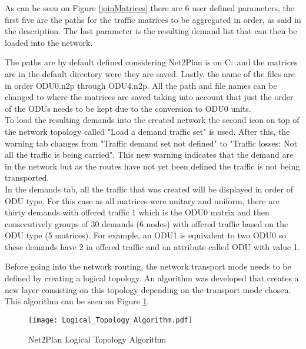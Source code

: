 	As can be seen on Figure \ref{joinMatrices} there are 6 user defined parameters, the first five are the paths for the traffic matrices to be aggregated in order, as said in the description. The last parameter is the resulting demand list that can then be loaded into the network.
	
	The paths are by default defined considering Net2Plan is on C:\ and the matrices are in the default directory were they are saved. Lastly, the name of the files are in order ODU0.n2p through ODU4.n2p. All the path and file names can be changed to where the matrices are saved taking into account that just the order of the ODUs needs to be kept due to the conversion to ODU0 units.\\
	
	To load the resulting demands into the created network the second icon on top of the network topology called "Load a demand traffic set" is used. After this, the warning tab changes from "Traffic demand set not defined" to "Traffic losses: Not all the traffic is being carried". This new warning indicates that the demand are in the network but as the routes have not yet been defined the traffic is not being transported.\\
	
	In the demands tab, all the traffic that was created will be displayed in order of ODU type. For this case as all matrices were unitary and uniform, there are thirty demands with offered traffic 1 which is the ODU0 matrix and then consecutively groups of 30 demands (6 nodes) with offered traffic based on the ODU type (5 matrices). For example, an ODU1 is equivalent to two ODU0 so these demands have 2 in offered traffic and an attribute called ODU with value 1.\\
	
	\pagebreak
	
	Before going into the network routing, the network transport mode needs to be defined by creating a logical topology. An algorithm was developed that creates a new layer consisting on this topology depending on the transport mode chosen. This algorithm can be seen on Figure \ref{Logical_Topology_Algorithm}.\\
	
	
	\begin{figure}[h!]
		\centering
		\texttt{[image: Logical\_Topology\_Algorithm.pdf]}
		\caption{Net2Plan Logical Topology Algorithm}
		\label{Logical_Topology_Algorithm}
	\end{figure}	
	
